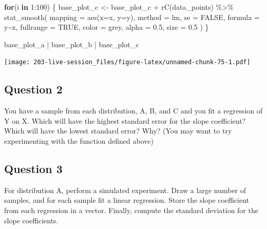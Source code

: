 \documentclass[
]{book}
\newenvironment{Shaded}{\begin{snugshade}}{\end{snugshade}}
\newcommand{\AttributeTok}[1]{\textcolor[rgb]{0.77,0.63,0.00}{#1}}
\newcommand{\ConstantTok}[1]{\textcolor[rgb]{0.00,0.00,0.00}{#1}}
\newcommand{\ControlFlowTok}[1]{\textcolor[rgb]{0.13,0.29,0.53}{\textbf{#1}}}
\newcommand{\DecValTok}[1]{\textcolor[rgb]{0.00,0.00,0.81}{#1}}
\newcommand{\FloatTok}[1]{\textcolor[rgb]{0.00,0.00,0.81}{#1}}
\newcommand{\FunctionTok}[1]{\textcolor[rgb]{0.00,0.00,0.00}{#1}}
\newcommand{\NormalTok}[1]{#1}
\newcommand{\OtherTok}[1]{\textcolor[rgb]{0.56,0.35,0.01}{#1}}
\newcommand{\SpecialCharTok}[1]{\textcolor[rgb]{0.00,0.00,0.00}{#1}}
\newcommand{\StringTok}[1]{\textcolor[rgb]{0.31,0.60,0.02}{#1}}
\theoremstyle{definition}
\theoremstyle{definition}
\theoremstyle{definition}
\theoremstyle{definition}
\theoremstyle{remark}
\begin{document}
\begin{Shaded}
\begin{Highlighting}[]
\ControlFlowTok{for}\NormalTok{(i }\ControlFlowTok{in} \DecValTok{1}\SpecialCharTok{:}\DecValTok{100}\NormalTok{) \{ }
\NormalTok{    base\_plot\_c }\OtherTok{\textless{}{-}}\NormalTok{ base\_plot\_c }\SpecialCharTok{+} \FunctionTok{rC}\NormalTok{(data\_points) }\SpecialCharTok{\%\textgreater{}\%} 
      \FunctionTok{stat\_smooth}\NormalTok{(}
        \AttributeTok{mapping =} \FunctionTok{aes}\NormalTok{(}\AttributeTok{x=}\NormalTok{x, }\AttributeTok{y=}\NormalTok{y), }
        \AttributeTok{method  =} \StringTok{\textquotesingle{}lm\textquotesingle{}}\NormalTok{,         }\AttributeTok{se =} \ConstantTok{FALSE}\NormalTok{, }
        \AttributeTok{formula =} \StringTok{\textquotesingle{}y\textasciitilde{}x\textquotesingle{}}\NormalTok{, }\AttributeTok{fullrange =} \ConstantTok{TRUE}\NormalTok{,}
        \AttributeTok{color   =} \StringTok{\textquotesingle{}grey\textquotesingle{}}\NormalTok{,    }\AttributeTok{alpha =} \FloatTok{0.5}\NormalTok{,}
        \AttributeTok{size    =} \FloatTok{0.5}
\NormalTok{      )}
\NormalTok{\}}

\NormalTok{base\_plot\_a }\SpecialCharTok{|}\NormalTok{ base\_plot\_b  }\SpecialCharTok{|}\NormalTok{ base\_plot\_c}
\end{Highlighting}
\end{Shaded}

\texttt{[image: 203-live-session\_files/figure-latex/unnamed-chunk-75-1.pdf]}

\hypertarget{question-2}{%
\subsection{Question 2}\label{question-2}}

You have a sample from each distribution, A, B, and C and you fit a regression of Y on X. Which will have the highest standard error for the slope coefficient? Which will have the lowest standard error? Why? (You may want to try experimenting with the function defined above)

\hypertarget{question-3}{%
\subsection{Question 3}\label{question-3}}

For distribution A, perform a simulated experiment. Draw a large number of samples, and for each sample fit a linear regression. Store the slope coefficient from each regression in a vector. Finally, compute the standard deviation for the slope coefficients.
\end{document}

